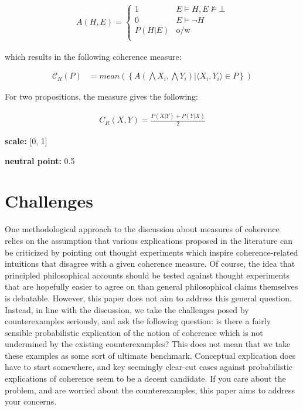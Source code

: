 \documentclass[10pt,]{scrartcl}
\begin{document}
\begin{align*}
    A(H,E) = \begin{cases}
    1 & E\models H, E\not \models \bot \\
    0 & E \models \neg H\\
    P(H|E) & \mbox{o/w} \\
    \end{cases}
\end{align*}

which results in the following coherence measure:

\begin{align}
\tag{Roche}  
    \mathcal{C}_{R}(P) & =
mean\left(\left\{A(\bigwedge X_i, \bigwedge Y_i) | \langle X_i, Y_i\rangle \in P\right\} \right) 
\end{align}

For two propositions, the measure gives the following:

\begin{align}
    \tag{Roche pairs}
    \label{coh:Roche}
     C_{R}(X,Y)= \frac{P(X|Y)+P(Y|X)}{2}
\end{align}

\noindent \textbf{scale:} {[}0, 1{]}

\noindent \textbf{neutral point:} 0.5

\section{Challenges}

One methodological approach to the discussion about measures of
coherence relies on the assumption that various explications proposed in
the literature can be criticized by pointing out thought experiments
which inspire coherence-related intuitions that disagree with a given
coherence measure. Of course, the idea that principled philosophical
accounts should be tested against thought experiments that are hopefully
easier to agree on than general philosophical claims themselves is
debatable. However, this paper does not aim to address this general
question. Instead, in line with the discussion, we take the challenges
posed by counterexamples seriously, and ask the following question: is
there a fairly sensible probabilistic explication of the notion of
coherence which is not undermined by the existing counterexamples? This
does not mean that we take these examples as some sort of ultimate
benchmark. Conceptual explication does have to start somewhere, and key
seemingly clear-cut cases against probabilistic explications of
coherence seem to be a decent candidate. If you care about the problem,
and are worried about the counterexamples, this paper aims to address
your concerns.
\end{document}
